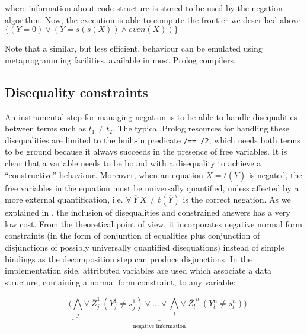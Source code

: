 \documentclass{tlp}
\begin{document}
\noindent
where information about code structure is stored to be used by the negation
algorithm. Now, the execution is able to compute the frontier we described
above $\{ ( Y=0 ) \vee ( Y=s(s(X)) \wedge even(X) ) \}$

Note that a similar, but less efficient, behaviour can be emulated
using metaprogramming facilities, available in most Prolog compilers.
 

\vspace{-0.1in}
\subsection{Disequality constraints}
\label{disequality}

An instrumental step for managing negation is to be able to handle
disequalities between terms such as $t_1 \neq t_2$.  The typical
Prolog resources for handling these disequalities are limited to the
built-in predicate {\tt /== /2}, which needs both terms to be ground
because it always succeeds in the presence of free variables.  It is
clear that a variable needs to be bound with a disequality to achieve
a ``constructive'' behaviour.  Moreover, when an equation $X =
t(\overline{Y})$ is negated, the free variables in the equation must
be universally quantified, unless affected by a more external
quantification, i.e. $\forall~ \overline{Y}~X \neq t(\overline{Y})$ is
the correct negation.  As we explained in \cite{SusanaPADL2000}, the
inclusion of disequalities and constrained answers has a very low
cost. From the theoretical point of view, it incorporates negative normal form 
constraints (in the form of conjuntion of equalities plus conjunction of 
disjunctions of possibly universally quantified
disequations) instead of simple bindings as the decomposition step can produce 
disjunctions. In the implementation side, attributed variables are used 
which associate a data structure, containing a
normal form constraint, to any variable: 

\[~~~~( \underbrace{\bigwedge_j \forall~ \overline{Z}_j^1~(Y_j^1 \neq s_j^1) 
\vee \ldots \vee \bigwedge_l \forall~ \overline{Z_l}^n~(Y_l^n \neq s_l^n) ) }_{\mbox{negative information}} \]

\end{document}

